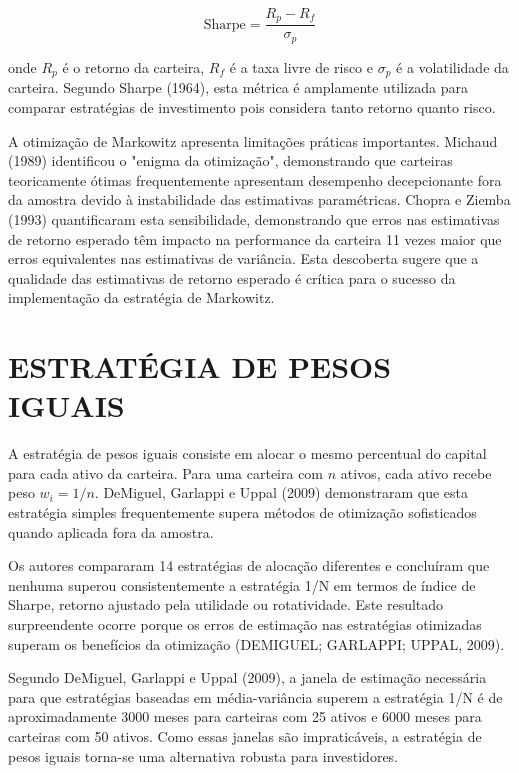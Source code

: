 \begin{equation}
\text{Sharpe} = \frac{R_p - R_f}{\sigma_p}
\end{equation}

onde $R_p$ é o retorno da carteira, $R_f$ é a taxa livre de risco e $\sigma_p$ é a volatilidade da carteira. Segundo Sharpe (1964), esta métrica é amplamente utilizada para comparar estratégias de investimento pois considera tanto retorno quanto risco.

A otimização de Markowitz apresenta limitações práticas importantes. Michaud (1989) identificou o "enigma da otimização", demonstrando que carteiras teoricamente ótimas frequentemente apresentam desempenho decepcionante fora da amostra devido à instabilidade das estimativas paramétricas. Chopra e Ziemba (1993) quantificaram esta sensibilidade, demonstrando que erros nas estimativas de retorno esperado têm impacto na performance da carteira 11 vezes maior que erros equivalentes nas estimativas de variância. Esta descoberta sugere que a qualidade das estimativas de retorno esperado é crítica para o sucesso da implementação da estratégia de Markowitz.

\section{ESTRATÉGIA DE PESOS IGUAIS}

A estratégia de pesos iguais consiste em alocar o mesmo percentual do capital para cada ativo da carteira. Para uma carteira com $n$ ativos, cada ativo recebe peso $w_i = 1/n$. DeMiguel, Garlappi e Uppal (2009) demonstraram que esta estratégia simples frequentemente supera métodos de otimização sofisticados quando aplicada fora da amostra.

Os autores compararam 14 estratégias de alocação diferentes e concluíram que nenhuma superou consistentemente a estratégia 1/N em termos de índice de Sharpe, retorno ajustado pela utilidade ou rotatividade. Este resultado surpreendente ocorre porque os erros de estimação nas estratégias otimizadas superam os benefícios da otimização (DEMIGUEL; GARLAPPI; UPPAL, 2009).

Segundo DeMiguel, Garlappi e Uppal (2009), a janela de estimação necessária para que estratégias baseadas em média-variância superem a estratégia 1/N é de aproximadamente 3000 meses para carteiras com 25 ativos e 6000 meses para carteiras com 50 ativos. Como essas janelas são impraticáveis, a estratégia de pesos iguais torna-se uma alternativa robusta para investidores.

